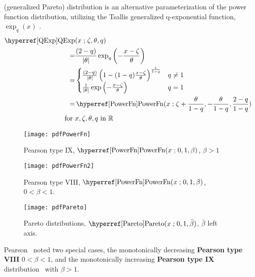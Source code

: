  (generalized Pareto) distribution is an alternative parameterization of the power function distribution, utilizing the Tsallis generalized q-exponential function, $\exp_q(x)$ .
\begin{align}
\label{QExp}
\opr{QExp}&(x\given  \pLoc,\theta,q) \\
\notag
= & \frac{(2-q)}{|\theta|} \exp_q\left(- \frac{x-\pLoc}{\theta} \right)  \checked
\\  
= &
\begin{cases}
\frac{(2-q)}{|\theta|}\left(1 - (1-q) \frac{x-\pLoc}{\theta} \right)^{\frac{1}{1-q}} & q \neq 1 \checked
\\
\notag
\tfrac{1}{|\theta| }\exp\left(- \frac{x-\pLoc}{\theta} \right)  & q=1 \checked
\end{cases}
\notag
\\
=&  \opr{PowerFn}(x\given \pLoc+\frac{\theta}{1-q},-\frac{\theta}{1-q},\frac{2-q}{1-q}) \checked
\\
\notag  \text{for } & x, \pLoc, \theta, q \text{ in } \mathbb{R}
\end{align}



\begin{figure}[p]
\begin{center}
\texttt{[image: pdfPowerFn]}
\end{center}
\caption[Pearson IX distributions]{Pearson type IX, $\opr{PowerFn}(x\given 0,1,\beta)$, $\beta>1$
}
\end{figure}
%
%
\begin{figure}[p]
\begin{center}
\texttt{[image: pdfPowerFn2]}
\end{center}
\caption[Pearson VIII distributions]{Pearson type VIII, $\opr{PowerFn}(x\given 0,1,\beta)$, $0<\beta<1$. }
\end{figure}
%
\begin{figure}[tp]
\begin{center}
\texttt{[image: pdfPareto]}
\end{center}
\caption[Pareto distributions]{Pareto distributions, $\opr{Pareto}(x\given 0,1,\bar\beta)$, $\bar\beta$ left axis.}
\end{figure}




Pearson~\cite{Pearson1916, Johnson1994} noted two special cases, the monotonically decreasing {\bf Pearson type VIII} $0<\beta <1$, and the monotonically increasing {\bf Pearson type IX} distribution~\cite{Pearson1916, Johnson1994} with $\beta>1$. 


